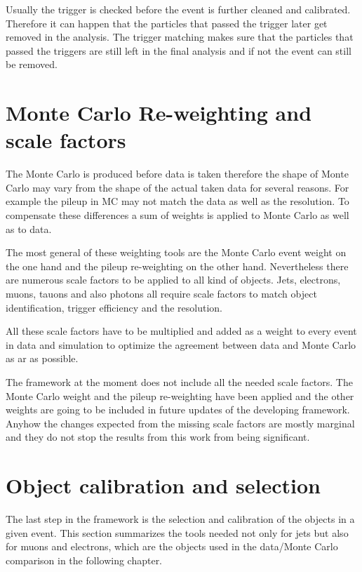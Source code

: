 Usually the trigger is checked before the event is further cleaned and calibrated. Therefore it can happen that the particles that passed the trigger later get removed in the analysis. The trigger matching makes sure that the particles that passed the triggers are still left in the final analysis and if not the event can still be removed.

\section{Monte Carlo Re-weighting and scale factors}

The Monte Carlo is produced before data is taken therefore the shape of Monte Carlo may vary from the shape of the actual taken data for several reasons. For example the pileup in MC may not match the data as well as the resolution. To compensate these differences a sum of weights is applied to Monte Carlo as well as to data.

The most general of these weighting tools are the Monte Carlo event weight on the one hand and the pileup re-weighting on the other hand. Nevertheless there are numerous scale factors to be applied to all kind of objects. Jets, electrons, muons, tauons and also photons all require scale factors to match object identification, trigger efficiency and the resolution. 

All these scale factors have to be multiplied and added as a weight to every event in data and simulation to optimize the agreement between data and Monte Carlo as ar as possible.

The framework at the moment does not include all the needed scale factors. The Monte Carlo weight and the pileup re-weighting have been applied and the other weights are going to be included in future updates of the developing framework. Anyhow the changes expected from the missing scale factors are mostly marginal and they do not stop the results from this work from being significant.

\section{Object calibration and selection}

The last step in the framework is the selection and calibration of the objects in a given event. This section summarizes the tools needed not only for jets but also for muons and electrons, which are the objects used in the data/Monte Carlo comparison in the following chapter.

